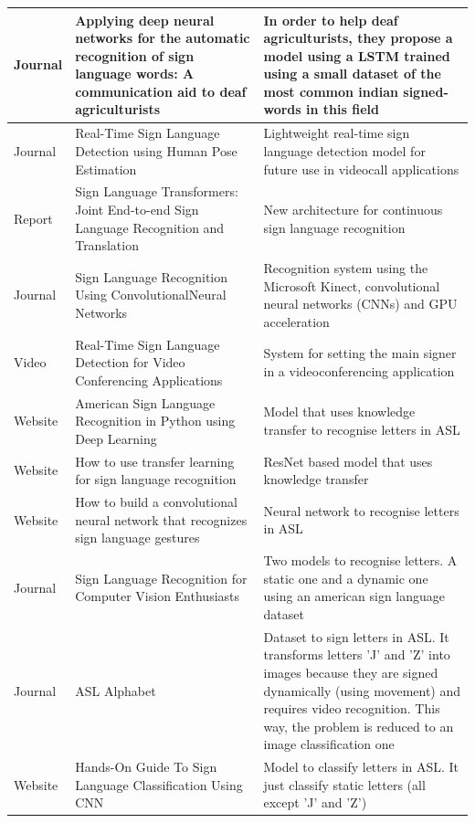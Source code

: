 \begin{longtable}{|p{3cm}|p{4cm}|p{6cm}|}
    \hline Journal & Applying deep neural networks for the automatic recognition of sign language words: A communication aid to deaf agriculturists \cite{Venugopalan2021} & In order to help deaf agriculturists, they propose a model using a LSTM trained using a small dataset of the most common indian signed-words in this field \\
    \hline Journal & Real-Time Sign Language Detection using Human Pose Estimation \cite{Moryossef2020} & Lightweight real-time sign language detection model for future use in videocall applications \\
    \hline Report  & Sign Language Transformers: Joint End-to-end Sign Language Recognition and Translation \cite{SignLanguageTransformers} & New architecture for continuous sign language recognition \\
    \hline Journal & Sign Language Recognition Using ConvolutionalNeural Networks \cite{Bronstein2015} & Recognition system using the Microsoft Kinect, convolutional neural networks (CNNs) and GPU acceleration \\
    \hline Video   & Real-Time Sign Language Detection for Video Conferencing Applications \cite{RT2021} & System for setting the main signer in a videoconferencing application \\
    \hline Website & American Sign Language Recognition in Python using Deep Learning \cite{ASLRecognitionPython} & Model that uses knowledge transfer to recognise letters in ASL \\
    \hline Website & How to use transfer learning for sign language recognition \cite{Vagdevi2019} & ResNet based model that uses knowledge transfer \\ 
    \hline Website & How to build a convolutional neural network that recognizes sign language gestures \cite{Vagdevi2019i} & Neural network to recognise letters in ASL \\
    \hline Journal & Sign Language Recognition for Computer Vision Enthusiasts \cite{Vaishshells2021} & Two models to recognise letters. A static one and a dynamic one using an american sign language dataset \\
    \hline Journal & ASL Alphabet \cite{Akash2018} & Dataset to sign letters in ASL. It transforms letters 'J' and 'Z' into images because they are signed dynamically (using movement) and requires video recognition. This way, the problem is reduced to an image classification one \\
    \hline Website & Hands-On Guide To Sign Language Classification Using CNN \cite{SignLanguageClassification2020} & Model to classify letters in ASL. It just classify static letters (all except 'J' and 'Z') \\

\end{longtable}
